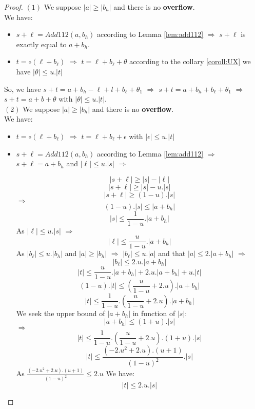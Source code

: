 \begin{proof} \color{-yellow}
$(1)$ We suppose $\lvert a \rvert \ge \lvert b_h \rvert $ 
and there is no \textbf{overflow}.\\
We have:
\begin{itemize}
    \item $s+ \ell = Add112(a,b_h)$ according to Lemma \ref{lem:add112} $\Rightarrow$ $s+\ell$ is exactly equal to $a+b_h$.
    \item $t = \circ (\ell + b_{\ell})$ $\Rightarrow$ $t = \ell + b_{\ell}+ \theta$ according to the collary \ref{coroll:UX} we have $\lvert \theta \rvert \le u. \lvert t \rvert$
\end{itemize}
So, we have $s+t = a+ b_h - \ell +l+b_{\ell} + \theta_1$ $\Rightarrow$ $s+t = a+ b_h + b_{\ell} + \theta_1$ $\Rightarrow$ $s+t = a+b + \theta $ with 
$\lvert \theta \rvert \le u. \lvert t \rvert$.\\

$(2)$ We suppose $\lvert a \rvert \ge \lvert b_h \rvert $
and there is no \textbf{overflow}.\\
We have:
\begin{itemize}
    \item $t= \circ(\ell + b_{\ell})$ $\Rightarrow$ $t= \ell + b_{\ell} +  \epsilon$
    with $\lvert \epsilon \rvert \le u. \lvert t \rvert$
    \item $s+ \ell = Add112(a,b_h)$ according to Lemma \ref{lem:add112} $\Rightarrow$ $s+\ell =a+b_h$ and  $\lvert \ell \rvert \le u. \lvert s \rvert$ $\Rightarrow$
    
    $$ \lvert s + \ell \rvert \ge \lvert s  \rvert - \lvert \ell \rvert $$
    $$ \lvert s + \ell \rvert \ge \lvert s  \rvert - u.\lvert s \rvert $$
    $$ \lvert s + \ell \rvert \ge (1 - u).\lvert s \rvert $$
    $\Rightarrow$
    $$(1 - u).\lvert s \rvert \le \lvert a+ b_h \rvert$$
    $$\lvert s \rvert \le \frac{1}{1-u}.\lvert a+ b_h \rvert$$
    As $\lvert \ell \rvert \le u. \lvert s \rvert$ $\Rightarrow$
    $$\lvert \ell \rvert \le \frac{u}{1-u}.\lvert a+ b_h \rvert$$
    As $\lvert b_{\ell} \rvert \le u. \lvert b_h \rvert$ and $\lvert a \rvert \ge \lvert b_h \rvert$
    $\Rightarrow$ $\lvert b_{\ell} \rvert \le u.\lvert a \rvert $ and that $\lvert a \rvert \le 2.\lvert a+b_h \rvert$ $\Rightarrow$\\
    $$ \lvert b_{\ell} \rvert \le 2.u. \lvert a+b_h \rvert$$
    $$\lvert t \rvert \le \frac{u}{1-u}. \lvert a+b_h \rvert + 2.u. \lvert a+b_h \rvert + u . \lvert t \rvert$$
    $$(1 - u).\lvert t \rvert \le (\frac{u}{1-u}  + 2.u). \lvert a+b_h \rvert$$
    $$\lvert t \rvert \le \frac{1}{1-u}.(\frac{u}{1-u}  + 2.u). \lvert a+b_h \rvert$$
    We seek the upper bound of $\lvert a+b_h \rvert $ in function of $\lvert s \rvert$:
    $$\lvert a+b_h \rvert \le (1+u). \lvert s \rvert$$
    $\Rightarrow$
    $$\lvert t \rvert \le \frac{1}{1-u}.(\frac{u}{1-u}  + 2.u). (1+u). \lvert s \rvert$$
   $$\lvert t \rvert \le \frac{(-2.u^2+2.u).(u+1)}{(1-u)^2}.\lvert s \rvert$$  
    As $\frac{(-2.u^2+2.u).(u+1)}{(1-u)^2} \le 2.u$
    We have:
    $$\lvert t \rvert \le 2.u.\lvert s \rvert$$
\end{itemize}
\end{proof}


